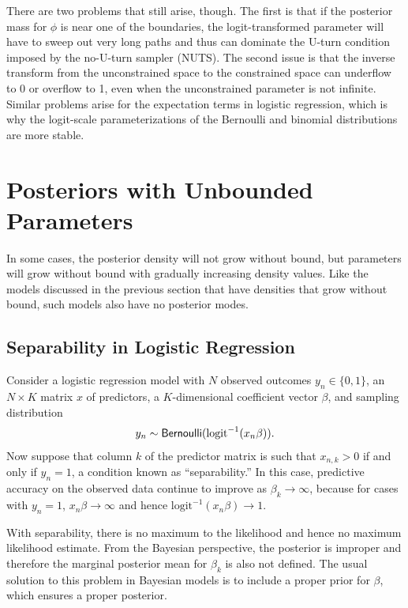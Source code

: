 There are two problems that still arise, though.  The first is that if
the posterior mass for $\phi$ is near one of the boundaries, the
logit-transformed parameter will have to sweep out very long paths and
thus can dominate the U-turn condition imposed by the no-U-turn
sampler (NUTS).  The second issue is that the inverse transform from
the unconstrained space to the constrained space can underflow to 0 or
overflow to 1, even when the unconstrained parameter is not infinite.
Similar problems arise for the expectation terms in logistic
regression, which is why the logit-scale parameterizations of the
Bernoulli and binomial distributions are more stable.



\section{Posteriors with Unbounded Parameters}

In some cases, the posterior density will not grow without bound, but
parameters will grow without bound with gradually increasing density
values.  Like the models discussed in the previous section that have
densities that grow without bound, such models also have no posterior
modes.


\subsection{Separability in Logistic Regression}

Consider a logistic regression model with $N$ observed outcomes $y_n
\in \{ 0, 1 \}$, an $N \times K$ matrix $x$ of predictors, a
$K$-dimensional coefficient vector $\beta$, and sampling distribution
\[
y_n \sim \distro{Bernoulli}(\mbox{logit}^{-1}(x_n \beta)).
\]
Now suppose that column $k$ of the predictor matrix is such that
$x_{n,k} > 0$ if and only if $y_n = 1$, a condition known as
``separability.''  In this case, predictive accuracy on the observed data
continue to improve as $\beta_k \rightarrow \infty$, because for cases
with $y_n = 1$, $x_n \beta \rightarrow \infty$ and hence
$\mbox{logit}^{-1}(x_n \beta) \rightarrow 1$.  

With separability, there is no maximum to the likelihood and hence no
maximum likelihood estimate.  From the Bayesian perspective, the
posterior is improper and therefore the marginal posterior mean for
$\beta_k$ is also not defined.  The usual solution to this problem in
Bayesian models is to include a proper prior for $\beta$, which
ensures a proper posterior.


